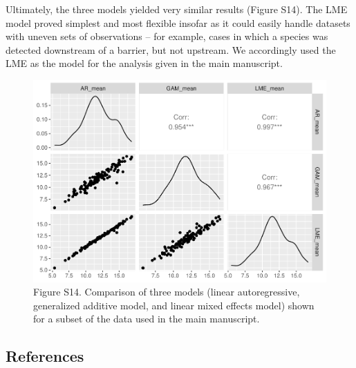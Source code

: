 \documentclass[
]{article}
\begin{document}
Ultimately, the three models yielded very similar results (Figure S14).
The LME model proved simplest and most flexible insofar as it could
easily handle datasets with uneven sets of observations -- for example,
cases in which a species was detected downstream of a barrier, but not
upstream. We accordingly used the LME as the model for the analysis
given in the main manuscript.

\begin{figure}
\centering
\includegraphics{../Output/SupplementalFigures/stats_comparisonplot.pdf}
\caption{Figure S14. Comparison of three models (linear autoregressive,
generalized additive model, and linear mixed effects model) shown for a
subset of the data used in the main
manuscript.\label{fig:comparemodels}}
\end{figure}

\newpage

\hypertarget{references}{%
\subsection*{References}\label{references}}
\end{document}

